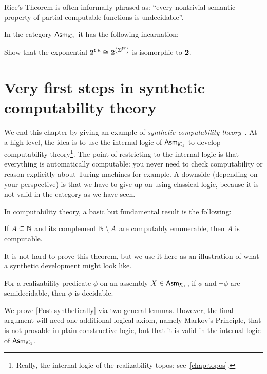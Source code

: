Rice's Theorem is often informally phrased as: ``every nontrivial semantic
property of partial computable functions is undecidable''.

In the category \(\Asm{\Kone}\) it has the following incarnation:
\begin{exercise}\label{exer:Rice-consequence}
  Show that the exponential \(\Two^\CE \cong \Two^{\pa*{\Sigma^\NatAsm}}\) is isomorphic to \(\Two\).
\end{exercise}

\section{Very first steps in synthetic computability theory}\label{sec:synthetic}

We end this chapter by giving an example of \emph{synthetic computability
theory}~\cite{Bauer2006}.
%
At a high level, the idea is to use the internal logic of \(\Asm{\Kone}\) to
develop computability theory\footnote{Really, the internal logic of the
  realizability topos; see~\cref{chap:topos}.}.
%
The point of restricting to the internal logic is that everything is
automatically computable: you never need to check computability or reason
explicitly about Turing machines for example.
%
A downside (depending on your perspective) is that we have to give up on using
classical logic, because it is not valid in the category as we have seen.

In computability theory, a basic but fundamental result is the following:

\begin{theorem*}[Post]
  If \(A \subseteq \Nat\) and its complement \(\Nat \setminus A\) are computably
  enumerable, then \(A\) is computable.
\end{theorem*}

It is not hard to prove this theorem, but we use it here as an illustration of
what a synthetic development might look like.

\begin{theorem}\label{Post-synthetically}
  For a realizability predicate \(\phi\) on an assembly \(X \in \Asm{\Kone}\),
  if \(\phi\) and \(\lnot\phi\) are semidecidable, then \(\phi\) is decidable.
\end{theorem}

We prove \cref{Post-synthetically} via two general lemmas.
%
However, the final argument will need one additional logical axiom, namely Markov's
Principle, that is not provable in plain constructive logic, but that it is
valid in the internal logic of \(\Asm{\Kone}\).

